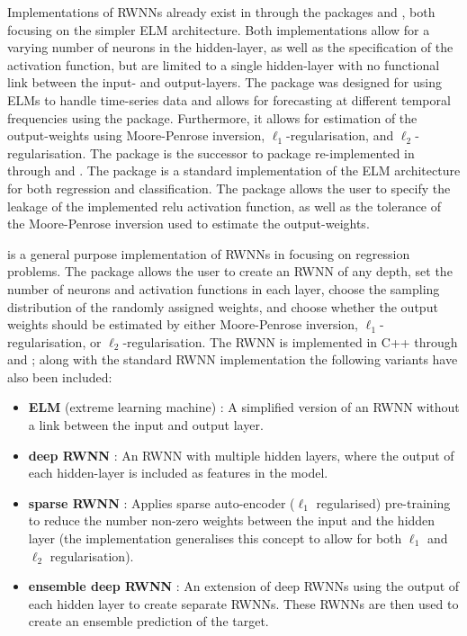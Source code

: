 \documentclass[
]{jss}
\providecommand{\tightlist}{%
  \setlength{\itemsep}{0pt}\setlength{\parskip}{0pt}}
\begin{document}
Implementations of RWNNs already exist in  through the
packages  \citep{nnfor} and 
\citep{elmNNRcpp}, both focusing on the simpler ELM architecture. Both
implementations allow for a varying number of neurons in the
hidden-layer, as well as the specification of the activation function,
but are limited to a single hidden-layer with no functional link between
the input- and output-layers. The  package was designed for
using ELMs to handle time-series data and allows for forecasting at
different temporal frequencies using the  package.
Furthermore, it allows for estimation of the output-weights using
Moore-Penrose inversion, \(\ell_1\)-regularisation, and
\(\ell_2\)-regularisation. The  package is the successor
to  package \citep{elmNN} re-implemented in 
through  and  \citep[\citet{RcppA}]{Rcpp}.
The package is a standard implementation of the ELM architecture for
both regression and classification. The package allows the user to
specify the leakage of the implemented relu activation function, as well
as the tolerance of the Moore-Penrose inversion used to estimate the
output-weights.

 is a general purpose implementation of RWNNs in 
\citep{R} focusing on regression problems. The  package allows
the user to create an RWNN of any depth, set the number of neurons and
activation functions in each layer, choose the sampling distribution of
the randomly assigned weights, and choose whether the output weights
should be estimated by either Moore-Penrose inversion,
\(\ell_1\)-regularisation, or \(\ell_2\)-regularisation. The RWNN is
implemented in C++ through  and ; along
with the standard RWNN implementation the following variants have also
been included:

\begin{itemize}
\tightlist
\item
  \textbf{ELM} (extreme learning machine) \citep{Huang2006}: A
  simplified version of an RWNN without a link between the input and
  output layer.
\item
  \textbf{deep RWNN} \citep[\citet{Shi2021}]{Henriquez2018}: An RWNN
  with multiple hidden layers, where the output of each hidden-layer is
  included as features in the model.
\item
  \textbf{sparse RWNN} \citep{Zhang2019}: Applies sparse auto-encoder
  (\(\ell_1\) regularised) pre-training to reduce the number non-zero
  weights between the input and the hidden layer (the implementation
  generalises this concept to allow for both \(\ell_1\) and \(\ell_2\)
  regularisation).
\item
  \textbf{ensemble deep RWNN} \citep{Shi2021}: An extension of deep
  RWNNs using the output of each hidden layer to create separate RWNNs.
  These RWNNs are then used to create an ensemble prediction of the
  target.
\end{itemize}
\end{document}
